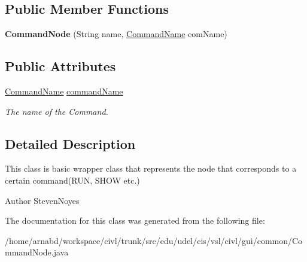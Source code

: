 \subsection*{Public Member Functions}
\begin{DoxyCompactItemize}
\item 
\hypertarget{classedu_1_1udel_1_1cis_1_1vsl_1_1civl_1_1gui_1_1common_1_1CommandNode_a376a68e79d8e61120500ba1d2101b2bc}{}{\bfseries Command\+Node} (String name, \hyperlink{enumedu_1_1udel_1_1cis_1_1vsl_1_1civl_1_1run_1_1IF_1_1CommandLine_1_1CommandName}{Command\+Name} com\+Name)\label{classedu_1_1udel_1_1cis_1_1vsl_1_1civl_1_1gui_1_1common_1_1CommandNode_a376a68e79d8e61120500ba1d2101b2bc}

\end{DoxyCompactItemize}
\subsection*{Public Attributes}
\begin{DoxyCompactItemize}
\item 
\hypertarget{classedu_1_1udel_1_1cis_1_1vsl_1_1civl_1_1gui_1_1common_1_1CommandNode_a9b5ccfddc7739dc0340d6011b558f255}{}\hyperlink{enumedu_1_1udel_1_1cis_1_1vsl_1_1civl_1_1run_1_1IF_1_1CommandLine_1_1CommandName}{Command\+Name} \hyperlink{classedu_1_1udel_1_1cis_1_1vsl_1_1civl_1_1gui_1_1common_1_1CommandNode_a9b5ccfddc7739dc0340d6011b558f255}{command\+Name}\label{classedu_1_1udel_1_1cis_1_1vsl_1_1civl_1_1gui_1_1common_1_1CommandNode_a9b5ccfddc7739dc0340d6011b558f255}

\begin{DoxyCompactList}\small\item\em The name of the Command. \end{DoxyCompactList}\end{DoxyCompactItemize}


\subsection{Detailed Description}
This class is basic wrapper class that represents the node that corresponds to a certain command(R\+U\+N, S\+H\+O\+W etc.) 

\begin{DoxyAuthor}{Author}
Steven\+Noyes 
\end{DoxyAuthor}


The documentation for this class was generated from the following file\+:\begin{DoxyCompactItemize}
\item 
/home/arnabd/workspace/civl/trunk/src/edu/udel/cis/vsl/civl/gui/common/Command\+Node.\+java\end{DoxyCompactItemize}
